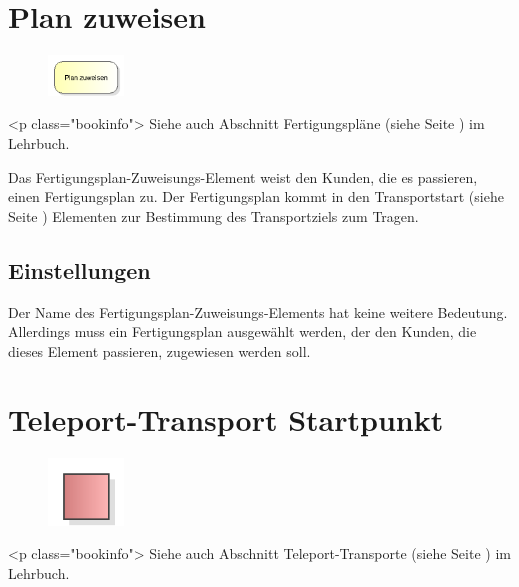 \section{Plan zuweisen}
\label{ref:ModelElementAssignSequence}

\begin{figure}
\vspace{-22pt}
\includegraphics[width=2cm]{imageModelElementAssignSequence.png}
\vspace{-22pt}
\end{figure}

<p class="bookinfo">
Siehe auch Abschnitt Fertigungspläne (siehe Seite \pageref{ref:book:8.3.3}) im Lehrbuch.

Das Fertigungsplan-Zuweisungs-Element weist den Kunden, die es passieren, einen Fertigungsplan zu.
Der Fertigungsplan kommt in den Transportstart (siehe Seite \pageref{ref:ModelElementTransportSource}) 
Elementen zur Bestimmung des Transportziels zum Tragen.

\subsection*{Einstellungen}

Der Name des Fertigungsplan-Zuweisungs-Elements hat keine weitere Bedeutung. Allerdings muss ein Fertigungsplan
ausgewählt werden, der den Kunden, die dieses Element passieren, zugewiesen werden soll.


\section{Teleport-Transport Startpunkt}
\label{ref:ModelElementTeleportSource}

\begin{figure}
\vspace{-22pt}
\includegraphics[width=2cm]{imageModelElementTeleportSource.png}
\vspace{-22pt}
\end{figure}

<p class="bookinfo">
Siehe auch Abschnitt Teleport-Transporte (siehe Seite \pageref{ref:book:8.3.5}) im Lehrbuch.

